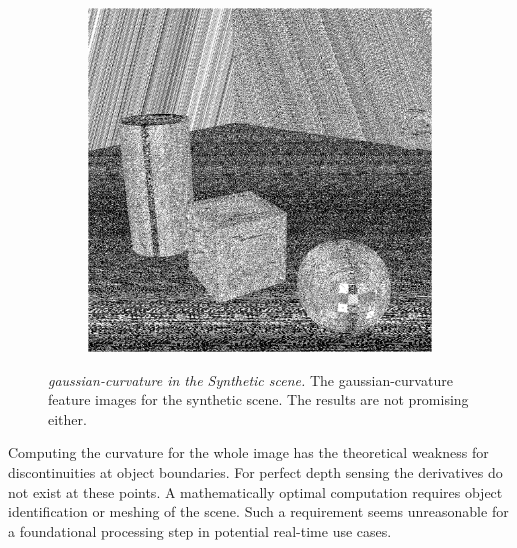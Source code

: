 \begin{figure}[H]
\begin{subfigure}[t]{0.32\textwidth}
    \end{subfigure}
    \begin{subfigure}[t]{0.32\textwidth}
        \includegraphics[width=\linewidth]{chapter04/img/gauss-0210.png}
    \end{subfigure}
    \caption[\Gls{gaussian-curvature} in the \emph{Synthetic} scene]{\emph{\Gls{gaussian-curvature} in the Synthetic scene.} The \Gls{gaussian-curvature} feature images for the synthetic scene. The results are not promising either.}\label{fig:gaussian-curvature}
\end{figure}
Computing the curvature for the whole image has the theoretical weakness for discontinuities at object boundaries.
For perfect depth sensing the derivatives do not exist at these points.
A mathematically optimal computation requires object identification or meshing of the scene.
Such a requirement seems unreasonable for a foundational processing step in potential real-time use cases.
